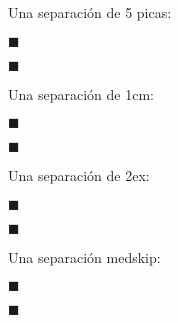 \documentclass{article}
\begin{document}
Una separación de 5 picas:

$\blacksquare$

\vspace{5pc}
$\blacksquare$

Una separación de 1cm:

$\blacksquare$

\vspace{1cm}
$\blacksquare$

Una separación de 2ex:

$\blacksquare$

\vspace{2ex}
$\blacksquare$

Una separación medskip:

$\blacksquare$

\medskip
$\blacksquare$
\end{document}
